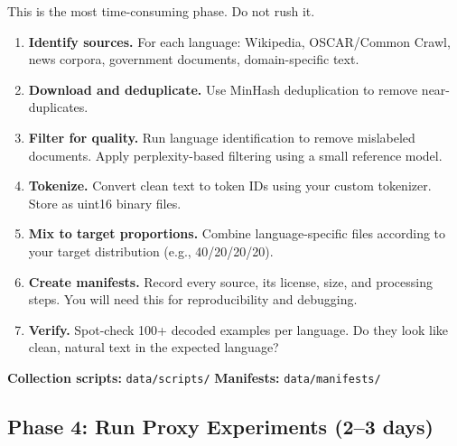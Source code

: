 \documentclass[11pt,a4paper]{article}
\begin{document}
This is the most time-consuming phase. Do not rush it.

\begin{enumerate}
    \item \textbf{Identify sources.} For each language: Wikipedia, OSCAR/Common Crawl, news corpora, government documents, domain-specific text.
    
    \item \textbf{Download and deduplicate.} Use MinHash deduplication to remove near-duplicates.
    
    \item \textbf{Filter for quality.} Run language identification to remove mislabeled documents. Apply perplexity-based filtering using a small reference model.
    
    \item \textbf{Tokenize.} Convert clean text to token IDs using your custom tokenizer. Store as uint16 binary files.
    
    \item \textbf{Mix to target proportions.} Combine language-specific files according to your target distribution (e.g., 40/20/20/20).
    
    \item \textbf{Create manifests.} Record every source, its license, size, and processing steps. You will need this for reproducibility and debugging.
    
    \item \textbf{Verify.} Spot-check 100+ decoded examples per language. Do they look like clean, natural text in the expected language?
\end{enumerate}

\begin{reporef}
\textbf{Collection scripts:} \texttt{data/scripts/}\hfill
\textbf{Manifests:} \texttt{data/manifests/}
\end{reporef}

\subsection{Phase 4: Run Proxy Experiments (2--3 days)}
\end{document}
